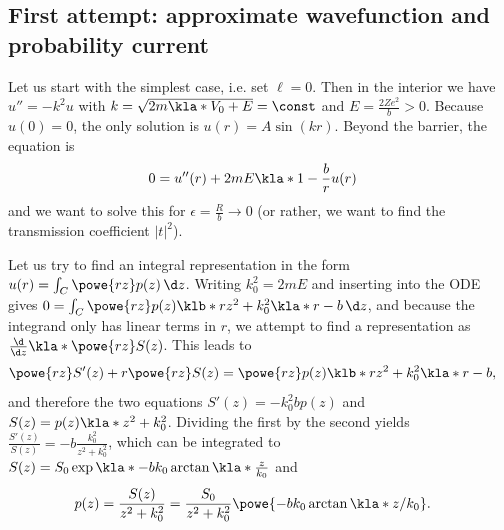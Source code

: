 \documentclass[english, parskip=full]{scrartcl}
\begin{document}
\subsection{First attempt: approximate wavefunction and probability current}
Let us start with the simplest case, i.e. set $\ell=0$.
Then in the interior we have $u''=-k^2u$ with $k=\sqrt{2m\kla*{V_0+E}}=\const$ and $E=\frac{2Ze^2}{b} > 0$.
Because $u(0)=0$, the only solution is $u(r)=A\sin(kr)$.
Beyond the barrier, the equation is
\begin{align}
0 &= u''(r) + 2mE\kla*{1 - \frac{b}{r}} u(r)
\end{align}
and we want to solve this for $\epsilon = \frac{R}{b} \rightarrow 0$ (or rather, we want to find the transmission coefficient $|t|^2$).

Let us try to find an integral representation in the form $u(r)=\int_C \powe{rz} p(z)\,\d z$.
Writing $k_0^2=2mE$ and inserting into the ODE gives $0 = \int_C \powe{rz} p(z) \klb*{rz^2 + k_0^2 \kla*{r-b}}\,\d z$, and because the integrand only has linear terms in $r$, we attempt to find a representation as $\frac{\d}{\d z} \kla*{\powe{rz}S(z)}$.
This leads to
\begin{align}
\powe{rz} S'(z) + r \powe{rz}S(z) &= \powe{rz} p(z) \klb*{rz^2 + k_0^2 \kla*{r-b}},
\end{align}
and therefore the two equations $S'(z)=-k_0^2 bp(z)$ and $S(z)=p(z)\kla*{z^2 + k_0^2}$.
Dividing the first by the second yields $\frac{S'(z)}{S(z)} = -b \frac{k_0^2}{z^2+k_0^2}$, which can be integrated to $S(z) = S_0\exp\kla*{-bk_0 \arctan\kla*{\frac{z}{k_0}}}$ and
\begin{align}
p(z) &= \frac{S(z)}{z^2+k_0^2} = \frac{S_0}{z^2+k_0^2} \powe{-bk_0 \arctan\kla*{z/k_0}}.
\end{align}
\end{document}
